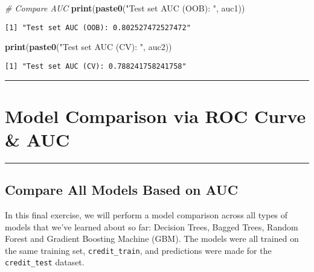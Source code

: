 \documentclass[
]{book}
\newenvironment{Shaded}{\begin{snugshade}}{\end{snugshade}}
\newcommand{\CommentTok}[1]{\textcolor[rgb]{0.56,0.35,0.01}{\textit{#1}}}
\newcommand{\KeywordTok}[1]{\textcolor[rgb]{0.13,0.29,0.53}{\textbf{#1}}}
\newcommand{\NormalTok}[1]{#1}
\newcommand{\StringTok}[1]{\textcolor[rgb]{0.31,0.60,0.02}{#1}}
\begin{document}
\begin{Shaded}
\begin{Highlighting}[]
\CommentTok{# Compare AUC }
\KeywordTok{print}\NormalTok{(}\KeywordTok{paste0}\NormalTok{(}\StringTok{"Test set AUC (OOB): "}\NormalTok{, auc1))                         }
\end{Highlighting}
\end{Shaded}

\begin{verbatim}
[1] "Test set AUC (OOB): 0.802527472527472"
\end{verbatim}

\begin{Shaded}
\begin{Highlighting}[]
\KeywordTok{print}\NormalTok{(}\KeywordTok{paste0}\NormalTok{(}\StringTok{"Test set AUC (CV): "}\NormalTok{, auc2))}
\end{Highlighting}
\end{Shaded}

\begin{verbatim}
[1] "Test set AUC (CV): 0.788241758241758"
\end{verbatim}

\begin{center}\rule{0.5\linewidth}{0.5pt}\end{center}

\hypertarget{model-comparison-via-roc-curve-auc}{%
\section{Model Comparison via ROC Curve \& AUC}\label{model-comparison-via-roc-curve-auc}}

\begin{center}\rule{0.5\linewidth}{0.5pt}\end{center}

\hypertarget{compare-all-models-based-on-auc}{%
\subsection{Compare All Models Based on AUC}\label{compare-all-models-based-on-auc}}

In this final exercise, we will perform a model comparison across all types of models that we've learned about so far: Decision Trees, Bagged Trees, Random Forest and Gradient Boosting Machine (GBM). The models were all trained on the same training set, \texttt{credit\_train}, and predictions were made for the \texttt{credit\_test} dataset.
\end{document}
